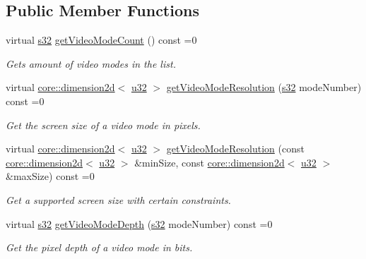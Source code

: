 \subsection*{Public Member Functions}
\begin{DoxyCompactItemize}
\item 
virtual \hyperlink{namespaceirr_ac66849b7a6ed16e30ebede579f9b47c6}{s32} \hyperlink{classirr_1_1video_1_1IVideoModeList_a532ba6311217a17a583f4b59a06efb25}{get\+Video\+Mode\+Count} () const  =0
\begin{DoxyCompactList}\small\item\em Gets amount of video modes in the list. \end{DoxyCompactList}\item 
virtual \hyperlink{classirr_1_1core_1_1dimension2d}{core\+::dimension2d}$<$ \hyperlink{namespaceirr_a0416a53257075833e7002efd0a18e804}{u32} $>$ \hyperlink{classirr_1_1video_1_1IVideoModeList_a5268585e2d8f71c5421891d4731a8ad4}{get\+Video\+Mode\+Resolution} (\hyperlink{namespaceirr_ac66849b7a6ed16e30ebede579f9b47c6}{s32} mode\+Number) const  =0
\begin{DoxyCompactList}\small\item\em Get the screen size of a video mode in pixels. \end{DoxyCompactList}\item 
virtual \hyperlink{classirr_1_1core_1_1dimension2d}{core\+::dimension2d}$<$ \hyperlink{namespaceirr_a0416a53257075833e7002efd0a18e804}{u32} $>$ \hyperlink{classirr_1_1video_1_1IVideoModeList_a17659edae60be3b79ca521a3e5ac040f}{get\+Video\+Mode\+Resolution} (const \hyperlink{classirr_1_1core_1_1dimension2d}{core\+::dimension2d}$<$ \hyperlink{namespaceirr_a0416a53257075833e7002efd0a18e804}{u32} $>$ \&min\+Size, const \hyperlink{classirr_1_1core_1_1dimension2d}{core\+::dimension2d}$<$ \hyperlink{namespaceirr_a0416a53257075833e7002efd0a18e804}{u32} $>$ \&max\+Size) const  =0
\begin{DoxyCompactList}\small\item\em Get a supported screen size with certain constraints. \end{DoxyCompactList}\item 
virtual \hyperlink{namespaceirr_ac66849b7a6ed16e30ebede579f9b47c6}{s32} \hyperlink{classirr_1_1video_1_1IVideoModeList_a10b6fd6da9747fcb2a34d9bca9473b10}{get\+Video\+Mode\+Depth} (\hyperlink{namespaceirr_ac66849b7a6ed16e30ebede579f9b47c6}{s32} mode\+Number) const  =0
\begin{DoxyCompactList}\small\item\em Get the pixel depth of a video mode in bits. \end{DoxyCompactList}\item 

\end{DoxyCompactItemize}

